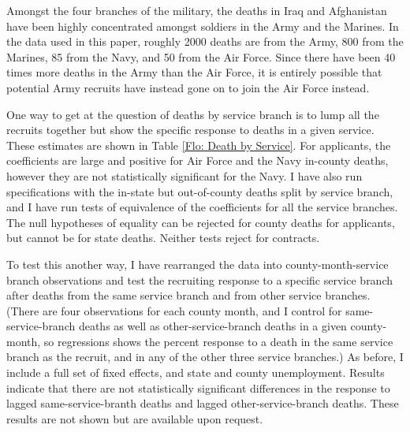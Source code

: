 \documentclass[12pt] {article}
\begin{document}
\begin{table}
\caption{}
\label{Flo:Recruits by Service}
\scalebox{0.8}{
}
\end{table}

Amongst the four branches of the military, the deaths in Iraq and Afghanistan have been highly concentrated amongst soldiers in the Army and the Marines. In the data used in this paper, roughly 2000 deaths are from the Army, 800 from the Marines, 85 from the Navy, and 50 from the Air Force. Since there have been 40 times more deaths in the Army than the Air Force, it is entirely possible that potential Army recruits have instead gone on to join the Air Force instead.

One way to get at the question of deaths by service branch is to lump all the recruits together but show the specific  response to deaths in a given service. These estimates are shown in Table \ref{Flo: Death by Service}. For applicants, the coefficients are large and positive for Air Force and the Navy in-county deaths, however they are not statistically significant for the Navy. I have also run specifications with the in-state but out-of-county deaths split by service branch, and I have run tests of equivalence of the coefficients for all the service branches. The null hypotheses of equality can be rejected for county deaths for applicants, but cannot be for state deaths. Neither tests reject for contracts.

\begin{table}
\caption{}
\label{Flo: Death by Service}
\scalebox{0.8}{
}
\end{table}

To test this another way, I have rearranged the data into county-month-service branch observations and test the recruiting response to a specific service branch after deaths from the same service branch and from other service branches. (There are four observations for each county month, and I control for same-service-branch deaths as well as other-service-branch deaths in a given county-month, so regressions shows the percent response to a death in the same service branch as the recruit, and in any of the other three service branches.) As before, I include a full set of fixed effects, and state and county unemployment. Results indicate that there are not statistically significant differences in the response to lagged same-service-branth deaths and lagged other-service-branch deaths. These results are not shown but are available upon request.
\end{document}
